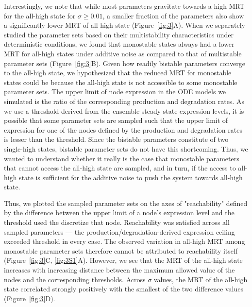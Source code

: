 \documentclass[11pt]{article}
\begin{document}
Interestingly, we note that while most parameters gravitate towards a high MRT for the all-high state for $\sigma \geq 0.01$, a smaller fraction of the parameters also show a significantly lower MRT of all-high state (Figure~\ref{fig:3}A). When we separately studied the parameter sets based on their multistability characteristics under deterministic conditions, we found that monostable states always had a lower MRT for all-high states under additive noise as compared to that of multistable parameter sets (Figure~\ref{fig:3}B). Given how readily bistable parameters converge to the all-high state, we hypothesized that the reduced MRT for monostable states could be because the all-high state is not accessible to some monostable parameter sets.  The upper limit of node expression in the ODE models we simulated is the ratio of the corresponding production and degradation rates. As we use a threshold derived from the ensemble steady state expression levels, it is possible that some parameter sets are sampled such that the upper limit of expression for one of the nodes defined by the production and degradation rates is lesser than the threshold. Since the bistable parameters constitute of two single-high states, bistable  parameter sets do not have this shortcoming. Thus, we wanted to understand whether it really is the case that monostable parameters that cannot access the all-high state are sampled, and in turn, if the access to all-high state is sufficient for the additive noise to push the system towards all-high state. 

Thus, we plotted the sampled parameter sets on the axes of "reachability" defined by the difference between the upper limit of a node's expression level and the threshold used the discretize that node. Reachability was satisfied across all sampled parameters — the production/degradation-derived expression ceiling exceeded threshold in every case. The observed variation in all-high MRT among monostable parameter sets therefore cannot be attributed to reachability itself (Figure~\ref{fig:3}C, \ref{fig:3S1}A). However, we see that the MRT of the all-high state increases with increasing distance between the maximum allowed value of the nodes and the corresponding thresholds. Across $\sigma$ values, the MRT of the all-high state correlated strongly positively with the smallest of the two difference values (Figure~\ref{fig:3}D). 
\end{document}
